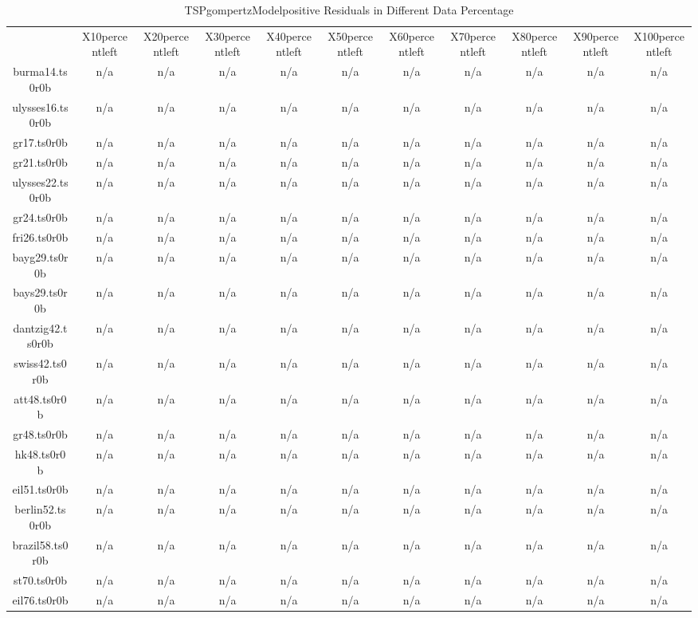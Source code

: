 \begin{table}[htbp]
\caption{TSPgompertzModelpositive Residuals in Different Data Percentage}
\centering
\begin{tabular}{|ccccccccccc|}
\hline
 & X10percentleft & X20percentleft & X30percentleft & X40percentleft & X50percentleft & X60percentleft & X70percentleft & X80percentleft & X90percentleft & X100percentleft \\
burma14.ts0r0b & n/a & n/a & n/a & n/a & n/a & n/a & n/a & n/a & n/a & n/a \\
ulysses16.ts0r0b & n/a & n/a & n/a & n/a & n/a & n/a & n/a & n/a & n/a & n/a \\
gr17.ts0r0b & n/a & n/a & n/a & n/a & n/a & n/a & n/a & n/a & n/a & n/a \\
gr21.ts0r0b & n/a & n/a & n/a & n/a & n/a & n/a & n/a & n/a & n/a & n/a \\
ulysses22.ts0r0b & n/a & n/a & n/a & n/a & n/a & n/a & n/a & n/a & n/a & n/a \\
gr24.ts0r0b & n/a & n/a & n/a & n/a & n/a & n/a & n/a & n/a & n/a & n/a \\
fri26.ts0r0b & n/a & n/a & n/a & n/a & n/a & n/a & n/a & n/a & n/a & n/a \\
bayg29.ts0r0b & n/a & n/a & n/a & n/a & n/a & n/a & n/a & n/a & n/a & n/a \\
bays29.ts0r0b & n/a & n/a & n/a & n/a & n/a & n/a & n/a & n/a & n/a & n/a \\
dantzig42.ts0r0b & n/a & n/a & n/a & n/a & n/a & n/a & n/a & n/a & n/a & n/a \\
swiss42.ts0r0b & n/a & n/a & n/a & n/a & n/a & n/a & n/a & n/a & n/a & n/a \\
att48.ts0r0b & n/a & n/a & n/a & n/a & n/a & n/a & n/a & n/a & n/a & n/a \\
gr48.ts0r0b & n/a & n/a & n/a & n/a & n/a & n/a & n/a & n/a & n/a & n/a \\
hk48.ts0r0b & n/a & n/a & n/a & n/a & n/a & n/a & n/a & n/a & n/a & n/a \\
eil51.ts0r0b & n/a & n/a & n/a & n/a & n/a & n/a & n/a & n/a & n/a & n/a \\
berlin52.ts0r0b & n/a & n/a & n/a & n/a & n/a & n/a & n/a & n/a & n/a & n/a \\
brazil58.ts0r0b & n/a & n/a & n/a & n/a & n/a & n/a & n/a & n/a & n/a & n/a \\
st70.ts0r0b & n/a & n/a & n/a & n/a & n/a & n/a & n/a & n/a & n/a & n/a \\
eil76.ts0r0b & n/a & n/a & n/a & n/a & n/a & n/a & n/a & n/a & n/a & n/a \\

\end{tabular}
\end{table}

